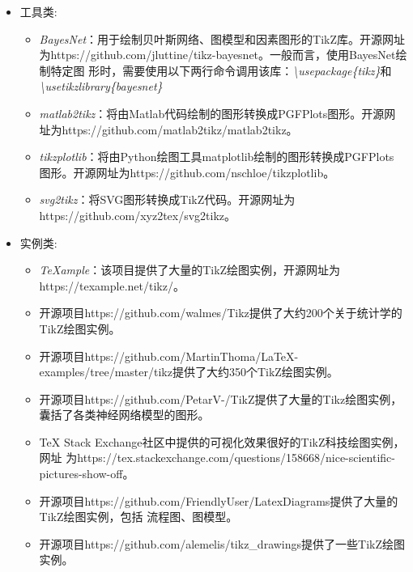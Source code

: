 \begin{itemize}
    \item 工具类:
          \begin{itemize}
              \item \emph{BayesNet}：用于绘制贝叶斯网络、图模型和因素图形的TikZ库。开源网址
                    为https://github.com/jluttine/tikz-bayesnet。一般而言，使用BayesNet绘制特定图
                    形时，需要使用以下两行命令调用该库：\emph{\textbackslash usepackage\{tikz\}}和
                    \emph{\textbackslash usetikzlibrary\{bayesnet\}}
              \item \emph{matlab2tikz}：将由Matlab代码绘制的图形转换成PGFPlots图形。开源网
                    址为https://github.com/matlab2tikz/matlab2tikz。
              \item \emph{tikzplotlib}：将由Python绘图工具matplotlib绘制的图形转换成PGFPlots
                    图形。开源网址为https://github.com/nschloe/tikzplotlib。
              \item \emph{svg2tikz}：将SVG图形转换成TikZ代码。开源网址为https://github.com/xyz2tex/svg2tikz。
          \end{itemize}
    \item 实例类:
          \begin{itemize}
              \item \emph{TeXample}：该项目提供了大量的TikZ绘图实例，开源网址为https://texample.net/tikz/。
              \item 开源项目https://github.com/walmes/Tikz提供了大约200个关于统计学的TikZ绘图实例。
              \item 开源项目https://github.com/MartinThoma/LaTeX-examples/tree/master/tikz提供了大约350个TikZ绘图实例。
              \item 开源项目https://github.com/PetarV-/TikZ提供了大量的Tikz绘图实例，囊括了各类神经网络模型的图形。
              \item TeX Stack Exchange社区中提供的可视化效果很好的TikZ科技绘图实例，网址
                    为https://tex.stackexchange.com/questions/158668/nice-scientific-pictures-show-off。
              \item 开源项目https://github.com/FriendlyUser/LatexDiagrams提供了大量的TikZ绘图实例，包括
                    流程图、图模型。
              \item 开源项目https://github.com/alemelis/tikz\_drawings提供了一些TikZ绘图实例。
          \end{itemize}
\end{itemize}

